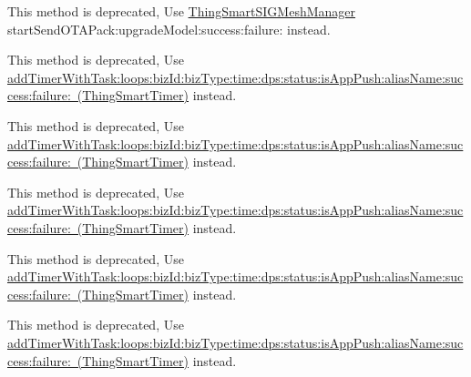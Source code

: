 \begin{DoxyRefList}
\label{deprecated__deprecated000093}%
%
This method is deprecated, Use \mbox{\hyperlink{interface_thing_smart_s_i_g_mesh_manager}{Thing\+Smart\+SIGMesh\+Manager}} start\+Send\+OTAPack\+:upgrade\+Model\+:success\+:failure\+: instead.  
\item[(Thing\+Deprecated\+Api) Member \mbox{\hyperlink{category_thing_smart_timer_07_thing_deprecated_api_08_a8553963a798f89a69f7a14237534fafe}{\mbox{[}Thing\+Smart\+Timer(Thing\+Deprecated\+Api) add\+Timer\+With\+Task\+:loops\+:dev\+Id\+:time\+:dps\+:time\+Zone\+:is\+App\+Push\+:alias\+Name\+:success\+:failure\+:\mbox{]}}} ]\label{deprecated__deprecated000097}%
%
This method is deprecated, Use \mbox{\hyperlink{interface_thing_smart_timer_a50e1140bc1cca7f995e872420b16487e}{add\+Timer\+With\+Task\+:loops\+:biz\+Id\+:biz\+Type\+:time\+:dps\+:status\+:is\+App\+Push\+:alias\+Name\+:success\+:failure\+: (\+Thing\+Smart\+Timer)}} instead. 

\label{deprecated__deprecated000124}%
%
This method is deprecated, Use \mbox{\hyperlink{interface_thing_smart_timer_a50e1140bc1cca7f995e872420b16487e}{add\+Timer\+With\+Task\+:loops\+:biz\+Id\+:biz\+Type\+:time\+:dps\+:status\+:is\+App\+Push\+:alias\+Name\+:success\+:failure\+: (\+Thing\+Smart\+Timer)}} instead. 

\label{deprecated__deprecated000106}%
%
This method is deprecated, Use \mbox{\hyperlink{interface_thing_smart_timer_a50e1140bc1cca7f995e872420b16487e}{add\+Timer\+With\+Task\+:loops\+:biz\+Id\+:biz\+Type\+:time\+:dps\+:status\+:is\+App\+Push\+:alias\+Name\+:success\+:failure\+: (\+Thing\+Smart\+Timer)}} instead. 

\label{deprecated__deprecated000115}%
%
This method is deprecated, Use \mbox{\hyperlink{interface_thing_smart_timer_a50e1140bc1cca7f995e872420b16487e}{add\+Timer\+With\+Task\+:loops\+:biz\+Id\+:biz\+Type\+:time\+:dps\+:status\+:is\+App\+Push\+:alias\+Name\+:success\+:failure\+: (\+Thing\+Smart\+Timer)}} instead.  
\item[(Thing\+Deprecated\+Api) Member \mbox{\hyperlink{category_thing_smart_timer_07_thing_deprecated_api_08_a642cf91f1876e5d1a3e4f63c31029fc4}{\mbox{[}Thing\+Smart\+Timer(Thing\+Deprecated\+Api) add\+Timer\+With\+Task\+:loops\+:dev\+Id\+:time\+:dps\+:time\+Zone\+:success\+:failure\+:\mbox{]}}} ]\label{deprecated__deprecated000096}%
%
This method is deprecated, Use \mbox{\hyperlink{interface_thing_smart_timer_a50e1140bc1cca7f995e872420b16487e}{add\+Timer\+With\+Task\+:loops\+:biz\+Id\+:biz\+Type\+:time\+:dps\+:status\+:is\+App\+Push\+:alias\+Name\+:success\+:failure\+: (\+Thing\+Smart\+Timer)}} instead. 


\end{DoxyRefList}
